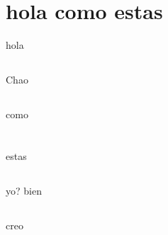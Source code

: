\documentclass{prueba}
\begin{document}
\section{hola como estas}
hola
\subsection{}
Chao
\subsection{}
como
\section{}
estas
\subsection{}
yo? bien
\subsection{}
creo
\end{document}
